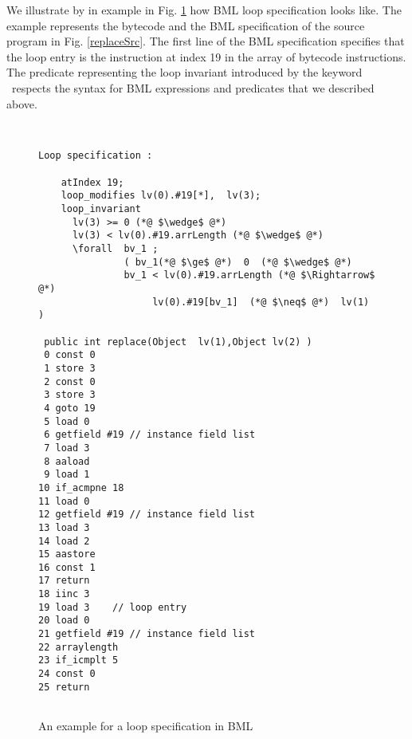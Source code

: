 We illustrate by in example in Fig. \ref{bml:loopBML} how BML loop specification looks like.
The example  represents the bytecode and the BML specification of the source program in Fig. \ref{replaceSrc}. The first line of the BML specification 
specifies that the loop entry is the instruction at index  19 in the array of bytecode instructions. The predicate
 representing  the loop invariant introduced by the keyword \loopInv \ respects the syntax for BML expressions and predicates
 that we described above. 
 
\begin{figure}
\begin{lstlisting}[frame=trbl]

  
Loop specification :

    atIndex 19;
    loop_modifies lv(0).#19[*],  lv(3);
    loop_invariant
      lv(3) >= 0 (*@ $\wedge$ @*) 
      lv(3) < lv(0).#19.arrLength (*@ $\wedge$ @*)
      \forall  bv_1 ; 
               ( bv_1(*@ $\ge$ @*)  0  (*@ $\wedge$ @*) 
               bv_1 < lv(0).#19.arrLength (*@ $\Rightarrow$ @*) 
                    lv(0).#19[bv_1]  (*@ $\neq$ @*)  lv(1) )

 public int replace(Object  lv(1),Object lv(2) )
 0 const 0
 1 store 3
 2 const 0
 3 store 3
 4 goto 19
 5 load 0
 6 getfield #19 // instance field list
 7 load 3
 8 aaload
 9 load 1
10 if_acmpne 18 
11 load 0
12 getfield #19 // instance field list
13 load 3
14 load 2
15 aastore
16 const 1
17 return
18 iinc 3  
19 load 3    // loop entry 
20 load 0
21 getfield #19 // instance field list 
22 arraylength
23 if_icmplt 5
24 const 0
25 return
 
\end{lstlisting}
\caption{\sc An example for a loop specification in BML} \label{bml:loopBML}\end{figure}




